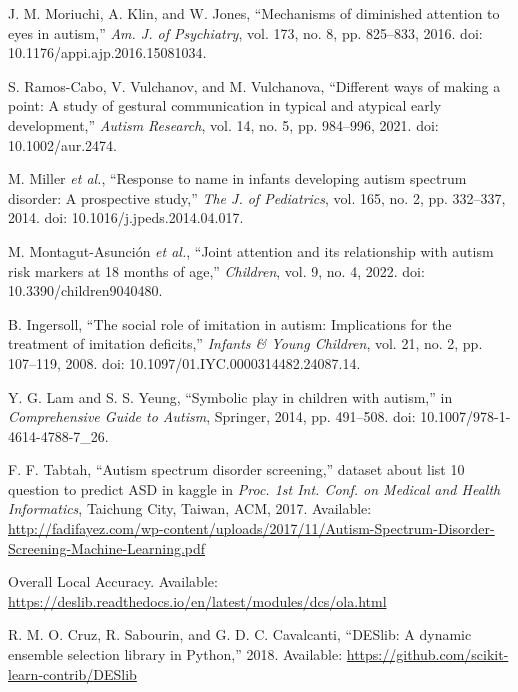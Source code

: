  J. M. Moriuchi, A. Klin, and W. Jones, ``Mechanisms of diminished attention to eyes in autism,'' \textit{Am. J. of Psychiatry}, vol. 173, no. 8, pp. 825--833, 2016. doi: 10.1176/appi.ajp.2016.15081034.

 S. Ramos-Cabo, V. Vulchanov, and M. Vulchanova, ``Different ways of making a point: A study of gestural communication in typical and atypical early development,'' \textit{Autism Research}, vol. 14, no. 5, pp. 984--996, 2021. doi: 10.1002/aur.2474.

 M. Miller \textit{et al.}, ``Response to name in infants developing autism spectrum disorder: A prospective study,'' \textit{The J. of Pediatrics}, vol. 165, no. 2, pp. 332--337, 2014. doi: 10.1016/j.jpeds.2014.04.017.

 M. Montagut-Asunción \textit{et al.}, ``Joint attention and its relationship with autism risk markers at 18 months of age,'' \textit{Children}, vol. 9, no. 4, 2022. doi: 10.3390/children9040480.

 B. Ingersoll, ``The social role of imitation in autism: Implications for the treatment of imitation deficits,'' \textit{Infants \& Young Children}, vol. 21, no. 2, pp. 107--119, 2008. doi: 10.1097/01.IYC.0000314482.24087.14.

 Y. G. Lam and S. S. Yeung, ``Symbolic play in children with autism,'' in \textit{Comprehensive Guide to Autism}, Springer, 2014, pp. 491--508. doi: 10.1007/978-1-4614-4788-7\_26.

 F. F. Tabtah, ``Autism spectrum disorder screening,'' dataset about list 10 question to predict ASD in kaggle in \textit{Proc. 1st Int. Conf. on Medical and Health Informatics}, Taichung City, Taiwan, ACM, 2017. Available: \url{http://fadifayez.com/wp-content/uploads/2017/11/Autism-Spectrum-Disorder-Screening-Machine-Learning.pdf}

 Overall Local Accuracy. Available: \url{https://deslib.readthedocs.io/en/latest/modules/dcs/ola.html}

 R. M. O. Cruz, R. Sabourin, and G. D. C. Cavalcanti, ``DESlib: A dynamic ensemble selection library in Python,'' 2018. Available: \url{https://github.com/scikit-learn-contrib/DESlib}

